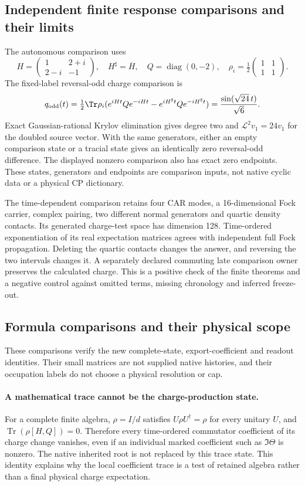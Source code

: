 \documentclass[12pt,a4paper]{article}
\begin{document}
\subsection{Independent finite response comparisons and their limits}
The autonomous comparison uses
\[
 H=\begin{pmatrix}1&2+i\\2-i&-1\end{pmatrix},\quad
 H^\sharp=\overline H,\quad Q=\operatorname{diag}(0,-2),\quad
 \rho_i=\tfrac12\begin{pmatrix}1&1\\1&1\end{pmatrix}.
\]
The fixed-label reversal-odd charge comparison is
\[
 q_{\rm odd}(t)=\tfrac12\Tr\rho_i
 (e^{iHt}Qe^{-iHt}-e^{iH^\sharp t}Qe^{-iH^\sharp t})
 =\frac{\sin(\sqrt{24}\,t)}{\sqrt6}.
\]
Exact Gaussian-rational Krylov elimination gives degree two and
$\mathcal L^2v_1=24v_1$ for the doubled source vector. With the same
generators, either an empty comparison state or a tracial state gives an
identically zero reversal-odd difference. The displayed nonzero comparison
also has exact zero endpoints. These states, generators and endpoints are
comparison inputs, not native cyclic data or a physical CP dictionary.

The time-dependent comparison retains four CAR modes, a 16-dimensional
Fock carrier, complex pairing, two different normal generators and quartic
density contacts. Its generated charge-test space has dimension 128.
Time-ordered exponentiation of its real expectation matrices agrees with
independent full Fock propagation. Deleting the quartic contacts changes
the answer, and reversing the two intervals changes it. A separately declared
commuting late comparison owner preserves the calculated charge. This is a
positive check of the finite theorems and a negative control against omitted
terms, missing chronology and inferred freeze-out.



\subsection{Formula comparisons and their physical scope}
\label{p4:v2171:app:fullchainchecks}
These comparisons verify the new complete-state, export-coefficient and
readout identities. Their small matrices are not supplied native histories,
and their occupation labels do not choose a physical resolution or cap.

\paragraph{A mathematical trace cannot be the charge-production state.}
For a complete finite algebra, $\rho=I/d$ satisfies
$U\rho U^\dagger=\rho$ for every unitary $U$, and
$\operatorname{Tr}(\rho[H,Q])=0$. Therefore every time-ordered commutator
coefficient of its charge change vanishes, even if an individual marked
coefficient such as $\Im\Theta$ is nonzero. The native inherited root is
not replaced by this trace state. This identity explains why the local
coefficient trace is a test of retained algebra rather than a final
physical charge expectation.
\end{document}

